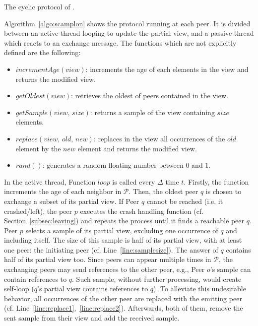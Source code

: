 \begin{algorithm}[h]
  
  \caption{\label{algo:scamplon}The cyclic protocol of \SPRAY{}.}
\end{algorithm}

Algorithm~\ref{algo:scamplon} shows the \SPRAY{} protocol running at each
peer. It is divided between an active thread looping to update the partial
view, and a passive thread which reacts to an exchange message. The functions
which are not explicitly defined are the following:
\begin{itemize}
\item $incrementAge(view)$: increments the age of each elements in the view
  and returns the modified view.
\item $getOldest(view)$: retrieves the oldest of peers contained in the view.
\item $getSample(view, \, size)$: returns a sample of the view containing
  $size$ elements.
\item $replace(view,\,old,\,new)$: replaces in the view all occurrences of
  the $old$ element by the $new$ element and returns the modified view.
\item $rand()$: generates a random floating number between $0$ and $1$.
\end{itemize}

In the active thread, Function $loop$ is called every $\Delta$ time
$t$. Firstly, the function increments the age of each neighbor in
$\mathcal{P}$. Then, the oldest peer $q$ is chosen to exchange a subset of its
partial view. If Peer $q$ cannot be reached (i.e. it crashed/left), the peer
$p$ executes the crash handling function (cf. Section~\ref{subsec:leaving}) and
repeats the process until it finds a reachable peer $q$. Peer $p$ selects a
sample of its partial view, excluding one occurrence of $q$ and including
itself. The size of this sample is half of its partial view, with at least one
peer: the initiating peer (cf. Line~\ref{line:samplesize}). The answer of $q$
contains half of its partial view too. Since peers can appear multiple times in
$\mathcal{P}$, the exchanging peers may send references to the other peer,
e.g., Peer $o$'s sample can contain references to $q$. Such sample, without
further processing, would create self-loop ($q$'s partial view contains
references to $q$). To alleviate this undesirable behavior, all occurrences of
the other peer are replaced with the emitting peer
(cf. Line~\ref{line:replace1},~\ref{line:replace2}).  Afterwards, both of them,
remove the sent sample from their view and add the received sample.

